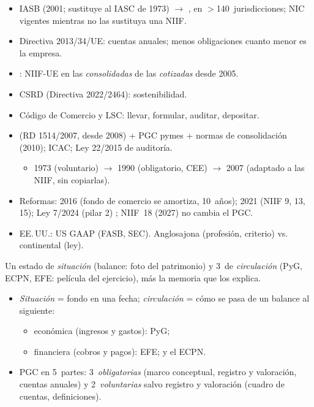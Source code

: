 \documentclass{article}
\begin{document}
\begin{columnas}
\begin{itemize}
\item IASB (2001; sustituye al IASC de 1973) $\to$ , en $>$140~jurisdicciones; NIC vigentes mientras no las sustituya una NIIF.
\end{itemize}
\begin{itemize}
\item Directiva 2013/34/UE: cuentas anuales; menos obligaciones cuanto menor es la empresa.
\item {}: NIIF-UE en las \emph{consolidadas} de las \emph{cotizadas} desde 2005.
\item CSRD (Directiva 2022/2464): sostenibilidad.
\end{itemize}
\begin{itemize}
\item Código de Comercio y LSC: llevar, formular, auditar, depositar.
\item {} (RD 1514/2007, desde 2008) + PGC pymes + normas de consolidación (2010); ICAC; Ley 22/2015 de auditoría.
  \begin{itemize}
  \item 1973 (voluntario) $\to$ 1990 (obligatorio, CEE) $\to$ 2007 (adaptado a las NIIF, sin copiarlas).
  \end{itemize}
\item Reformas: 2016 (fondo de comercio se amortiza, 10~años); 2021 (NIIF 9, 13, 15); Ley 7/2024 (pilar 2) ; NIIF~18 (2027) no cambia el PGC.
\item EE.\,UU.: US GAAP (FASB, SEC). Anglosajona (profesión, criterio) vs. continental (ley).
\end{itemize}

\begin{ideaclave}
Un estado de \emph{situación} (balance: foto del patrimonio) y 3~de \emph{circulación} (PyG, ECPN, EFE: película del ejercicio), más la memoria que los explica.
\end{ideaclave}
\begin{itemize}
\item \emph{Situación} = fondo en una fecha; \emph{circulación} = cómo se pasa de un balance al siguiente:
  \begin{itemize}
  \item económica (ingresos y gastos): PyG;
  \item financiera (cobros y pagos): EFE; y el ECPN.
  \end{itemize}
\item PGC en 5~partes: 3~\emph{obligatorias} (marco conceptual, registro y valoración, cuentas anuales) y 2~\emph{voluntarias} salvo registro y valoración (cuadro de cuentas, definiciones).
\end{itemize}


\end{columnas}
\end{document}
